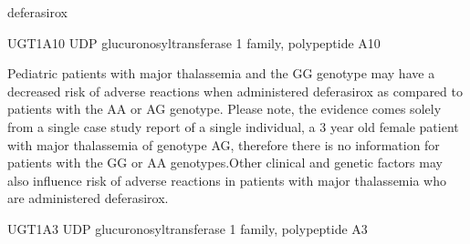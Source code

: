 \documentclass{resume} %
\begin{document}
\begin{rSection}{ deferasirox }
\begin{rSubsection}{ UGT1A10 }{ UDP glucuronosyltransferase 1 family, polypeptide A10 }{}{}
\item[] Pediatric patients with major thalassemia and the GG genotype may have a decreased risk of adverse reactions when administered deferasirox as compared to patients with the AA or AG genotype. Please note, the evidence comes solely from a single case study report of a single individual, a 3 year old female patient with major thalassemia of genotype AG, therefore there is no information for patients with the GG or AA genotypes.Other clinical and genetic factors may also influence risk of adverse reactions in patients with major thalassemia who are administered deferasirox.
\end{rSubsection}\begin{rSubsection}{ UGT1A3 }{ UDP glucuronosyltransferase 1 family, polypeptide A3 }{}{}
\item[]


\end{rSubsection}
\end{rSection}
\end{document}
